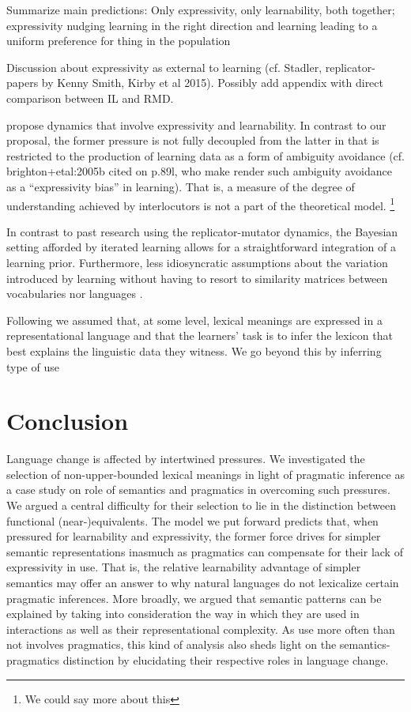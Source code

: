 \documentclass[a4paper]{article}
\newcommand{\hl}[1]{\textcolor[rgb]{.8,.33,.0}{#1}}%
\begin{document}
\hl{Summarize main predictions: Only expressivity, only learnability, both together; expressivity nudging learning in the right direction and learning leading to a uniform preference for thing in the population}

Discussion about expressivity as external to learning (cf. Stadler, replicator-papers by Kenny Smith, Kirby et al 2015). Possibly add appendix with direct comparison between IL and RMD.

\hl{\citet{kirby+etal:2015} propose dynamics that involve expressivity and learnability. In contrast to our proposal, the former pressure is not fully decoupled from the latter in that is restricted to the production of learning data as a form of ambiguity avoidance (cf. brighton+etal:2005b cited on p.89l, who make render such ambiguity avoidance as a ``expressivity bias'' in learning). That is, a measure of the degree of understanding achieved by interlocutors is not a part of the theoretical model. }\footnote{\hl{We could say more about this}}

In contrast to past research using the replicator-mutator dynamics, the Bayesian setting afforded by iterated learning allows for a straightforward integration of a learning prior. Furthermore, less idiosyncratic assumptions about the variation introduced by learning without having to resort to similarity matrices between vocabularies \citep{nowak+krakauer:1999} nor languages \citep{nowak+etal:2002}.


Following \citet{piantadosi+etal:quantifiers} we assumed that, at some level, lexical meanings are expressed in a representational language and that the learners' task is to infer the lexicon that best explains the linguistic data they witness. We go beyond this by inferring type of use

\section{Conclusion}
Language change is affected by intertwined pressures. We investigated the selection of non-upper-bounded lexical meanings in light of pragmatic inference as a case study on role of semantics and pragmatics in overcoming such pressures. We argued a central difficulty for their selection to lie in the distinction between functional (near-)equivalents.  The model we put forward predicts that, when  pressured for learnability and expressivity, the former force drives for simpler semantic representations inasmuch as pragmatics can compensate for their lack of expressivity in use. That is, the relative learnability advantage of simpler semantics may offer an answer to why natural languages do not lexicalize certain pragmatic inferences. More broadly, we argued that semantic patterns can be explained by taking into consideration the way in which they are used in interactions as well as their representational complexity. As use more often than not involves pragmatics, this kind of analysis also sheds light on the semantics-pragmatics distinction by elucidating their respective roles in language change. 
\end{document}

